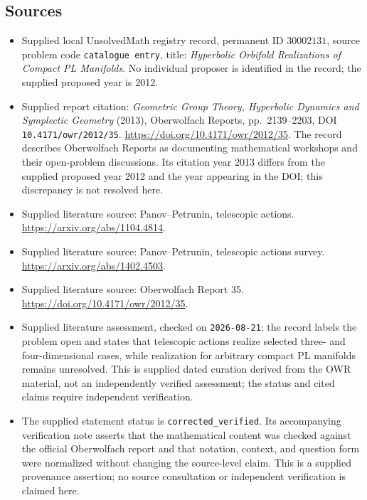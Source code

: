 \documentclass[11pt]{article}
\begin{document}
\subsection{Sources}
\begin{itemize}
\item Supplied local UnsolvedMath registry record, permanent ID \(30002131\), source problem code \texttt{catalogue entry}, title: \emph{Hyperbolic Orbifold Realizations of Compact PL Manifolds}. No individual proposer is identified in the record; the supplied proposed year is 2012.
\item Supplied report citation: \emph{Geometric Group Theory, Hyperbolic Dynamics and Symplectic Geometry} (2013), Oberwolfach Reports, pp.~2139--2203, DOI \texttt{10.4171/owr/2012/35}. \url{https://doi.org/10.4171/owr/2012/35}. The record describes Oberwolfach Reports as documenting mathematical workshops and their open-problem discussions. Its citation year 2013 differs from the supplied proposed year 2012 and the year appearing in the DOI; this discrepancy is not resolved here.
\item Supplied literature source: Panov--Petrunin, telescopic actions. \url{https://arxiv.org/abs/1104.4814}.
\item Supplied literature source: Panov--Petrunin, telescopic actions survey. \url{https://arxiv.org/abs/1402.4503}.
\item Supplied literature source: Oberwolfach Report 35. \url{https://doi.org/10.4171/owr/2012/35}.
\item Supplied literature assessment, checked on \texttt{2026-08-21}: the record labels the problem open and states that telescopic actions realize selected three- and four-dimensional cases, while realization for arbitrary compact PL manifolds remains unresolved. This is supplied dated curation derived from the OWR material, not an independently verified assessment; the status and cited claims require independent verification.
\item The supplied statement status is \texttt{corrected\_verified}. Its accompanying verification note asserts that the mathematical content was checked against the official Oberwolfach report and that notation, context, and question form were normalized without changing the source-level claim. This is a supplied provenance assertion; no source consultation or independent verification is claimed here.
\end{itemize}
\end{document}
